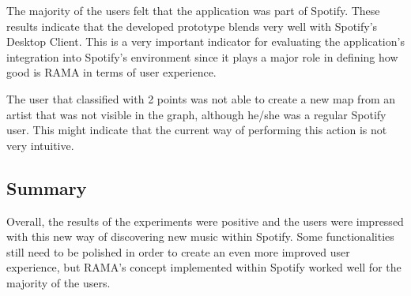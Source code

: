       The majority of the users felt that the application was part of Spotify.
      These results indicate that the developed prototype blends very well with Spotify's Desktop Client.
      This is a very important indicator for evaluating the application's integration into Spotify's environment since it plays a major role in defining how good is RAMA in terms of user experience.

      The user that classified with 2 points was not able to create a new map from an artist that was not visible in the graph, although he/she was a regular Spotify user.
      This might indicate that the current way of performing this action is not very intuitive.
  

  \subsection{Summary}

    Overall, the results of the experiments were positive and the users were impressed with this new way of discovering new music within Spotify.
    Some functionalities still need to be polished in order to create an even more improved user experience, but RAMA's concept implemented within Spotify worked well for the majority of the users.
  
